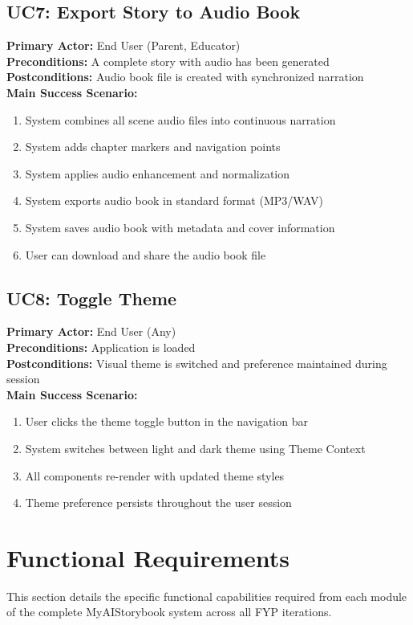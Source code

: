 \subsection{UC7: Export Story to Audio Book}
\textbf{Primary Actor:} End User (Parent, Educator)\\
\textbf{Preconditions:} A complete story with audio has been generated\\
\textbf{Postconditions:} Audio book file is created with synchronized narration\\
\textbf{Main Success Scenario:}
\begin{enumerate}
    \item System combines all scene audio files into continuous narration
    \item System adds chapter markers and navigation points
    \item System applies audio enhancement and normalization
    \item System exports audio book in standard format (MP3/WAV)
    \item System saves audio book with metadata and cover information
    \item User can download and share the audio book file
\end{enumerate}

\subsection{UC8: Toggle Theme}
\textbf{Primary Actor:} End User (Any)\\
\textbf{Preconditions:} Application is loaded\\
\textbf{Postconditions:} Visual theme is switched and preference maintained during session\\
\textbf{Main Success Scenario:}
\begin{enumerate}
    \item User clicks the theme toggle button in the navigation bar
    \item System switches between light and dark theme using Theme Context
    \item All components re-render with updated theme styles
    \item Theme preference persists throughout the user session
\end{enumerate}

\section{Functional Requirements}
This section details the specific functional capabilities required from each module of the complete MyAIStorybook system across all FYP iterations.

